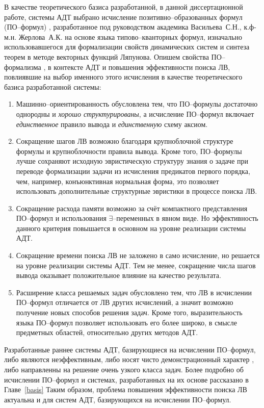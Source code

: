 В качестве теоретического базиса разработанной, в данной диссертационной работе, системы АДТ выбрано исчисление позитивно--образованных формул (ПО--формул) \cite{ICDS2000, Vas1995}, разработанное под руководством академика Васильева~С.Н., к.ф-м.н. Жерлова~А.К. на основе языка типово--кванторных формул, изначально использовавшегося для формализации свойств динамических систем и синтеза теорем в методе векторных функций Ляпунова. Опишем свойства ПО--формализма \cite{ICDS2000}, в контексте АДТ и повышения эффективности поиска ЛВ, повлиявшие на выбор именного этого исчисления в качестве теоретического базиса разработанной системы:
\begin{enumerate}
\item {Машинно--ориентированность} обусловлена тем, что ПО--формулы достаточно однородны и \emph{хорошо структурированы}, а исчисление ПО--формул включает \emph{единственное} правило вывода и \emph{единственную} схему аксиом.
\item {Сокращение шагов ЛВ} возможно благодаря крупноблочной структуре формулы и крупноблочности правила вывода. Кроме того, ПО--формулы лучше сохраняют исходную эвристическую структуру знания о задаче при переводе формализации задачи из исчисления предикатов первого порядка, чем, например, конъюнктивная нормальная форма, это позволяет использовать дополнительные структурные эвристики в процессе поиска ЛВ.
\item {Сокращение расхода памяти} возможно за счёт компактного представления ПО--формул и использования $\exists$--переменных в явном виде. Но эффективность данного критерия повышается в основном на уровне реализации системы АДТ.
\item {Сокращение времени поиска ЛВ} не заложено в само исчисление, но решается на уровне реализации системы АДТ. Тем не менее, сокращение числа шагов вывода оказывает положительное влияние на качество результата.
\item {Расширение класса решаемых задач} обусловлено тем, что ЛВ в исчислении ПО--формул отличается от ЛВ других исчислений, а значит возможно получение новых способов решения задач. Кроме того, выразительность языка ПО--формул позволяет использовать его более широко, в смысле предметных областей, относительно других методов АДТ.
\end{enumerate}

Разработанные раннее системы АДТ, базирующиеся на исчислении ПО--формул, либо являются неэффективным, либо носят чисто демонстрационный характер \cite{dissChe}, либо направленны на решение очень узкого класса задач. Более подробно об исчислении ПО--формул и системах, разработанных на их основе рассказано в Главе~\ref{basis} Таким образом, проблема повышения эффективности поиска ЛВ актуальна и для систем АДТ, базирующихся на исчислении ПО--формул.

